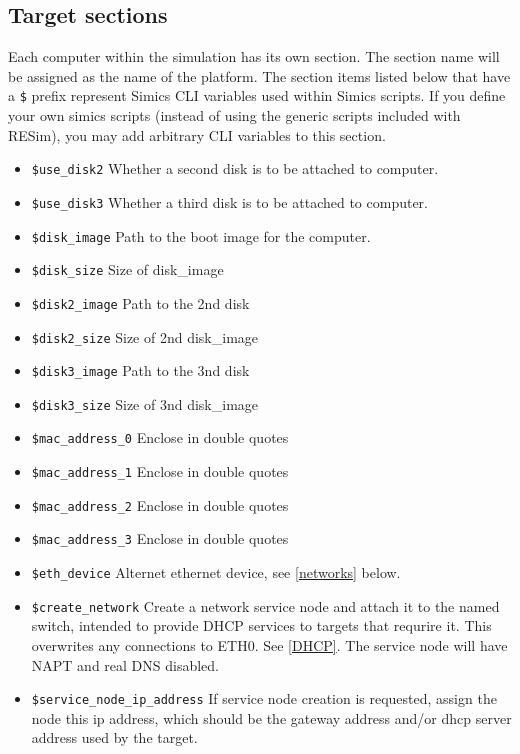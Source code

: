 \documentclass[titlepage]{article}
\begin{document}
\subsection{Target sections}
Each computer within the simulation has its own section. The section name will
be assigned as the name of the platform.  The section items listed below that 
have a {\tt \$} prefix represent Simics CLI variables used within Simics scripts.  If you define your own
simics scripts (instead of using the generic scripts included with RESim), you may add arbitrary CLI variables
to this section. 
\begin{itemize}
\item {\tt \$use\_disk2} Whether a second disk is to be attached to computer.
\item {\tt \$use\_disk3} Whether a third disk is to be attached to computer.
\item {\tt \$disk\_image} Path to the boot image for the computer.
\item {\tt \$disk\_size} Size of disk\_image
\item {\tt \$disk2\_image} Path to the 2nd disk
\item {\tt \$disk2\_size} Size of 2nd disk\_image
\item {\tt \$disk3\_image} Path to the 3nd disk
\item {\tt \$disk3\_size} Size of 3nd disk\_image
\item {\tt \$mac\_address\_0} Enclose in double quotes
\item {\tt \$mac\_address\_1} Enclose in double quotes
\item {\tt \$mac\_address\_2} Enclose in double quotes
\item {\tt \$mac\_address\_3} Enclose in double quotes
\item {\tt \$eth\_device} Alternet ethernet device, see \ref{networks} below.
\item {\tt \$create\_network} Create a network service node and attach it to the named switch, intended
to provide DHCP services to targets that requrire it. This overwrites any connections to ETH0.  See \ref{DHCP}.
The service node will have NAPT and real DNS disabled.  
\item {\tt \$service\_node\_ip\_address} If service node creation is requested, assign the node this ip address, which
should be the gateway address and/or dhcp server address used by the target.


\end{itemize}
\end{document}
